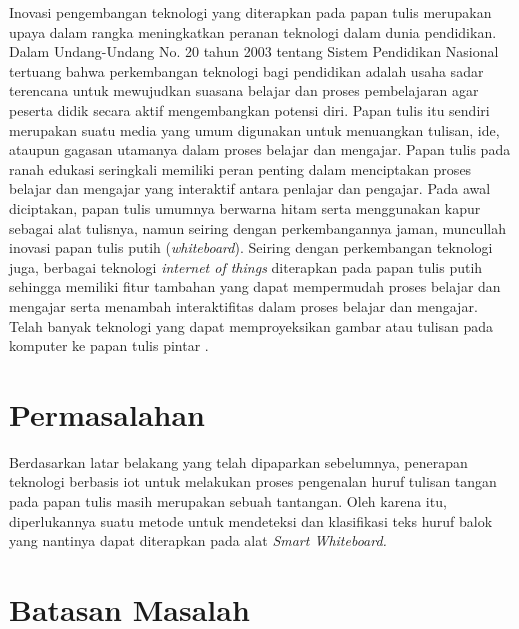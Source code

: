 Inovasi pengembangan teknologi yang diterapkan pada papan tulis merupakan upaya dalam rangka meningkatkan peranan teknologi dalam dunia pendidikan. Dalam Undang-Undang No. 20 tahun 2003 tentang Sistem Pendidikan Nasional tertuang bahwa perkembangan teknologi bagi pendidikan adalah usaha sadar terencana untuk mewujudkan suasana belajar dan proses pembelajaran agar peserta didik secara aktif mengembangkan potensi diri. Papan tulis itu sendiri merupakan suatu media yang umum digunakan untuk menuangkan tulisan, ide, ataupun gagasan utamanya dalam proses belajar dan mengajar. Papan tulis pada ranah edukasi seringkali memiliki peran penting dalam menciptakan proses belajar dan mengajar yang interaktif antara penlajar dan pengajar. Pada awal diciptakan, papan tulis umumnya berwarna hitam serta menggunakan kapur sebagai alat tulisnya, namun seiring dengan perkembangannya jaman,  muncullah inovasi papan tulis putih (\textit{whiteboard}). Seiring dengan perkembangan teknologi juga, berbagai teknologi \textit{internet of things} diterapkan pada papan tulis putih sehingga memiliki fitur tambahan yang dapat mempermudah proses belajar dan mengajar serta menambah interaktifitas dalam proses belajar dan mengajar. Telah banyak teknologi yang dapat memproyeksikan gambar atau tulisan pada komputer ke papan tulis pintar \citep*{kellerman2018smart}. \par

\section{Permasalahan}
\label{sec:permasalahan}
Berdasarkan latar belakang yang telah dipaparkan sebelumnya, penerapan teknologi berbasis iot untuk melakukan proses pengenalan huruf tulisan tangan pada papan tulis masih merupakan sebuah tantangan. Oleh karena itu, diperlukannya suatu metode untuk mendeteksi dan klasifikasi teks huruf balok yang nantinya dapat diterapkan pada alat \textit{Smart Whiteboard.}

\section{Batasan Masalah}
\label{sec:batasanmasalah}

